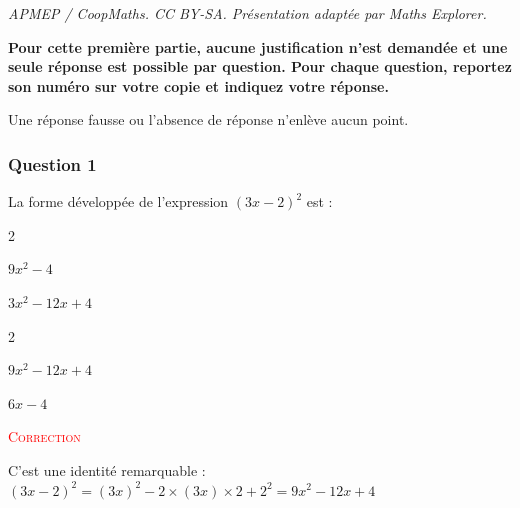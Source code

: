 \documentclass[10pt]{article}
\begin{document}
\noindent\textit{APMEP / CoopMaths. CC BY-SA. Présentation adaptée par Maths Explorer.}\par\medskip
\textbf{Pour cette première partie, aucune justification n'est demandée et une seule réponse est possible par question. Pour chaque question, reportez son numéro sur votre copie et indiquez votre réponse.}

	Une réponse fausse ou l'absence de réponse n'enlève aucun point.


	\vspace{0,25cm}
\subsubsection*{Question 1}
La forme développée de l'expression \mbox{$(3x-2)^2$} est :
		\begin{enumerate}[label=\alph*)]
\begin{multicols}{2}
			\item \mbox{$9x^2-4$}
			\item \mbox{$3x^2-12x+4$}

\end{multicols}
\begin{multicols}{2}
	\item \mbox{$9x^2-12x+4$}
	\item \mbox{$6x-4$}

	\end{multicols}
		\end{enumerate}


 \textcolor{red}{\textsc{Correction}}


	C'est une identité remarquable : \quad \mbox{$(3x-2)^2 = (3x)^2 - 2\times (3x) \times 2 + 2^2 = 9x^2-12x+4$}

	\hfill {}
\end{document}
